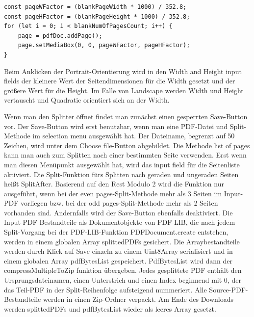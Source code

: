 \begin{lstlisting}[style=ES6, caption={Berechnung der PDF-Seitengröße}, label=code:mediabox, breaklines=true]
const pageWFactor = (blankPageWidth * 1000) / 352.8;
const pageHFactor = (blankPageHeight * 1000) / 352.8;
for (let i = 0; i < blankNumOfPagesCount; i++) {
	page = pdfDoc.addPage();
	page.setMediaBox(0, 0, pageWFactor, pageHFactor);
}
\end{lstlisting} 

Beim Anklicken der Portrait-Orientierung wird in den Width and Height input fields der kleinere Wert der Seitendimensionen für die Width gesetzt und der größere Wert für die Height. Im Falle von Landscape werden Width und Height vertauscht und Quadratic orientiert sich an der Width.
\par
Wenn man den Splitter öffnet findet man zunächst einen gesperrten Save-Button vor. Der Save-Button wird erst benutzbar, wenn man eine PDF-Datei und Split-Methode im selection menu ausgewählt hat. Der Dateiname, begrenzt auf 50 Zeichen, wird unter dem Choose file-Button abgebildet. Die Methode list of pages kann man auch zum Splitten nach einer bestimmten Seite verwenden. Erst wenn man diesen Menüpunkt ausgewählt hat, wird das input field für die Seitenliste aktiviert. Die Split-Funktion fürs Splitten nach geraden und ungeraden Seiten heißt SplitAfter. Basierend auf den Rest Modulo 2 wird die Funktion nur ausgeführt, wenn bei der even pages-Split-Methode mehr als 3 Seiten im Input-PDF vorliegen bzw. bei der odd pages-Split-Methode mehr als 2 Seiten vorhanden sind. Andernfalls wird der Save-Button ebenfalls deaktiviert. Die Input-PDF Bestandteile als Dokumentobjekte von PDF-LIB, die nach jedem Split-Vorgang bei der PDF-LIB-Funktion PDFDocument.create entstehen, werden in einem globalen Array splittedPDFs gesichert. Die Arraybestandteile werden durch Klick auf Save einzeln zu einem Uint8Array serialisiert und in einem globalen Array pdfBytesList gespeichert. PdfBytesList wird dann der compressMultipleToZip funktion übergeben. Jedes gesplittete PDF enthält den Ursprungsdateinamen, einen Unterstrich und einen Index beginnend mit 0, der das Teil-PDF in der Split-Reihenfolge aufsteigend nummeriert. Alle Source-PDF-Bestandteile werden in einen Zip-Ordner verpackt. Am Ende des Downloads werden splittedPDFs und pdfBytesList wieder als leeres Array gesetzt.
\par
